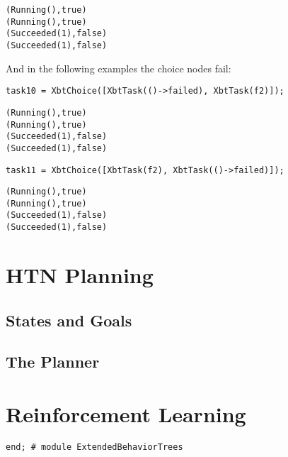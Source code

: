 \documentclass[a4wide]{article}
\begin{document}
\begin{verbatim}
(Running(),true)
(Running(),true)
(Succeeded(1),false)
(Succeeded(1),false)
\end{verbatim}

And in the following examples the choice nodes fail:

\begin{verbatim}
task10 = XbtChoice([XbtTask(()->failed), XbtTask(f2)]);
\end{verbatim}

\begin{verbatim}
(Running(),true)
(Running(),true)
(Succeeded(1),false)
(Succeeded(1),false)
\end{verbatim}

\begin{verbatim}
task11 = XbtChoice([XbtTask(f2), XbtTask(()->failed)]);
\end{verbatim}

\begin{verbatim}
(Running(),true)
(Running(),true)
(Succeeded(1),false)
(Succeeded(1),false)
\end{verbatim}

\section{HTN Planning}
\label{sec-4}

\subsection{States and Goals}
\label{sec-4-1}

\subsection{The Planner}
\label{sec-4-2}

\section{Reinforcement Learning}
\label{sec-5}

\begin{verbatim}
end; # module ExtendedBehaviorTrees
\end{verbatim}
\end{document}
